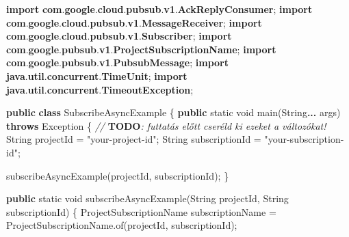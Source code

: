 \documentclass[
]{article}
\newenvironment{Shaded}{}{}
\newcommand{\AlertTok}[1]{\textcolor[rgb]{1.00,0.00,0.00}{\textbf{#1}}}
\newcommand{\BuiltInTok}[1]{\textcolor[rgb]{0.00,0.50,0.00}{#1}}
\newcommand{\CommentTok}[1]{\textcolor[rgb]{0.38,0.63,0.69}{\textit{#1}}}
\newcommand{\DataTypeTok}[1]{\textcolor[rgb]{0.56,0.13,0.00}{#1}}
\newcommand{\FunctionTok}[1]{\textcolor[rgb]{0.02,0.16,0.49}{#1}}
\newcommand{\ImportTok}[1]{\textcolor[rgb]{0.00,0.50,0.00}{\textbf{#1}}}
\newcommand{\KeywordTok}[1]{\textcolor[rgb]{0.00,0.44,0.13}{\textbf{#1}}}
\newcommand{\NormalTok}[1]{#1}
\newcommand{\OperatorTok}[1]{\textcolor[rgb]{0.40,0.40,0.40}{#1}}
\newcommand{\StringTok}[1]{\textcolor[rgb]{0.25,0.44,0.63}{#1}}
\begin{document}
\begin{Shaded}
\begin{Highlighting}[]
\KeywordTok{import} \ImportTok{com}\OperatorTok{.}\ImportTok{google}\OperatorTok{.}\ImportTok{cloud}\OperatorTok{.}\ImportTok{pubsub}\OperatorTok{.}\ImportTok{v1}\OperatorTok{.}\ImportTok{AckReplyConsumer}\OperatorTok{;}
\KeywordTok{import} \ImportTok{com}\OperatorTok{.}\ImportTok{google}\OperatorTok{.}\ImportTok{cloud}\OperatorTok{.}\ImportTok{pubsub}\OperatorTok{.}\ImportTok{v1}\OperatorTok{.}\ImportTok{MessageReceiver}\OperatorTok{;}
\KeywordTok{import} \ImportTok{com}\OperatorTok{.}\ImportTok{google}\OperatorTok{.}\ImportTok{cloud}\OperatorTok{.}\ImportTok{pubsub}\OperatorTok{.}\ImportTok{v1}\OperatorTok{.}\ImportTok{Subscriber}\OperatorTok{;}
\KeywordTok{import} \ImportTok{com}\OperatorTok{.}\ImportTok{google}\OperatorTok{.}\ImportTok{pubsub}\OperatorTok{.}\ImportTok{v1}\OperatorTok{.}\ImportTok{ProjectSubscriptionName}\OperatorTok{;}
\KeywordTok{import} \ImportTok{com}\OperatorTok{.}\ImportTok{google}\OperatorTok{.}\ImportTok{pubsub}\OperatorTok{.}\ImportTok{v1}\OperatorTok{.}\ImportTok{PubsubMessage}\OperatorTok{;}
\KeywordTok{import} \ImportTok{java}\OperatorTok{.}\ImportTok{util}\OperatorTok{.}\ImportTok{concurrent}\OperatorTok{.}\ImportTok{TimeUnit}\OperatorTok{;}
\KeywordTok{import} \ImportTok{java}\OperatorTok{.}\ImportTok{util}\OperatorTok{.}\ImportTok{concurrent}\OperatorTok{.}\ImportTok{TimeoutException}\OperatorTok{;}

\KeywordTok{public} \KeywordTok{class}\NormalTok{ SubscribeAsyncExample }\OperatorTok{\{}
  \KeywordTok{public} \DataTypeTok{static} \DataTypeTok{void} \FunctionTok{main}\OperatorTok{(}\BuiltInTok{String}\KeywordTok{...}\NormalTok{ args}\OperatorTok{)} \KeywordTok{throws} \BuiltInTok{Exception} \OperatorTok{\{}
    \CommentTok{// }\AlertTok{TODO}\CommentTok{: futtatás előtt cseréld ki ezeket a változókat!}
    \BuiltInTok{String}\NormalTok{ projectId }\OperatorTok{=} \StringTok{"your{-}project{-}id"}\OperatorTok{;}
    \BuiltInTok{String}\NormalTok{ subscriptionId }\OperatorTok{=} \StringTok{"your{-}subscription{-}id"}\OperatorTok{;}

    \FunctionTok{subscribeAsyncExample}\OperatorTok{(}\NormalTok{projectId}\OperatorTok{,}\NormalTok{ subscriptionId}\OperatorTok{);}
  \OperatorTok{\}}

  \KeywordTok{public} \DataTypeTok{static} \DataTypeTok{void} \FunctionTok{subscribeAsyncExample}\OperatorTok{(}\BuiltInTok{String}\NormalTok{ projectId}\OperatorTok{,} \BuiltInTok{String}\NormalTok{ subscriptionId}\OperatorTok{)} \OperatorTok{\{}
\NormalTok{    ProjectSubscriptionName subscriptionName }\OperatorTok{=}
\NormalTok{        ProjectSubscriptionName}\OperatorTok{.}\FunctionTok{of}\OperatorTok{(}\NormalTok{projectId}\OperatorTok{,}\NormalTok{ subscriptionId}\OperatorTok{);}


\end{Highlighting}
\end{Shaded}
\end{document}
